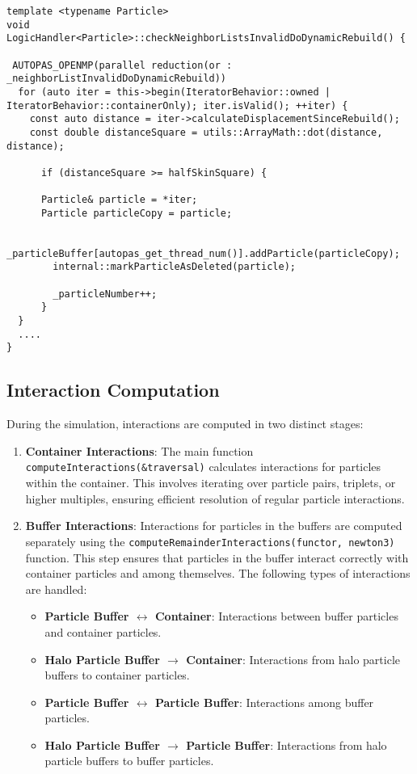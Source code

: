\begin{lstlisting}[style=cppstyle]
template <typename Particle>
void LogicHandler<Particle>::checkNeighborListsInvalidDoDynamicRebuild() {

 AUTOPAS_OPENMP(parallel reduction(or : _neighborListInvalidDoDynamicRebuild))
  for (auto iter = this->begin(IteratorBehavior::owned | IteratorBehavior::containerOnly); iter.isValid(); ++iter) {
    const auto distance = iter->calculateDisplacementSinceRebuild();
    const double distanceSquare = utils::ArrayMath::dot(distance, distance);

      if (distanceSquare >= halfSkinSquare) {

      Particle& particle = *iter;
      Particle particleCopy = particle;

       _particleBuffer[autopas_get_thread_num()].addParticle(particleCopy);
        internal::markParticleAsDeleted(particle);

        _particleNumber++;
      }
  }
  ....
}
\end{lstlisting}

\subsection{Interaction Computation}
During the simulation, interactions are computed in two distinct stages:

\begin{enumerate}
    \item \textbf{Container Interactions}: The main function \texttt{computeInteractions(\&traversal)} calculates interactions for particles within the container. This involves iterating over particle pairs, triplets, or higher multiples, ensuring efficient resolution of regular particle interactions.

    \item \textbf{Buffer Interactions}: Interactions for particles in the buffers are computed separately using the \texttt{computeRemainderInteractions(functor, newton3)} function. This step ensures that particles in the buffer interact correctly with container particles and among themselves. The following types of interactions are handled:
    \begin{itemize}
        \item \textbf{Particle Buffer \(\leftrightarrow\) Container}: Interactions between buffer particles and container particles.
        \item \textbf{Halo Particle Buffer \(\rightarrow\) Container}: Interactions from halo particle buffers to container particles.
        \item \textbf{Particle Buffer \(\leftrightarrow\) Particle Buffer}: Interactions among buffer particles.
        \item \textbf{Halo Particle Buffer \(\rightarrow\) Particle Buffer}: Interactions from halo particle buffers to buffer particles.
    \end{itemize}
\end{enumerate}

